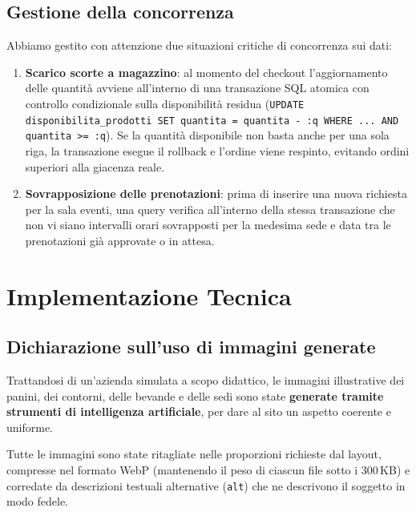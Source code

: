 \documentclass[a4paper,11pt]{article}
\begin{document}
\subsection{Gestione della concorrenza}
Abbiamo gestito con attenzione due situazioni critiche di concorrenza sui dati:
\begin{enumerate}
    \item \textbf{Scarico scorte a magazzino}: al momento del checkout l'aggiornamento delle quantità avviene all'interno di una transazione SQL atomica con controllo condizionale sulla disponibilità residua (\texttt{UPDATE disponibilita\_prodotti SET quantita = quantita - :q WHERE ... AND quantita >= :q}). Se la quantità disponibile non basta anche per una sola riga, la transazione esegue il rollback e l'ordine viene respinto, evitando ordini superiori alla giacenza reale.
    \item \textbf{Sovrapposizione delle prenotazioni}: prima di inserire una nuova richiesta per la sala eventi, una query verifica all'interno della stessa transazione che non vi siano intervalli orari sovrapposti per la medesima sede e data tra le prenotazioni già approvate o in attesa.
\end{enumerate}

\section{Implementazione Tecnica}

\subsection{Dichiarazione sull'uso di immagini generate}
Trattandosi di un'azienda simulata a scopo didattico, le immagini illustrative dei panini, dei contorni, delle bevande e delle sedi sono state \textbf{generate tramite strumenti di intelligenza artificiale}, per dare al sito un aspetto coerente e uniforme.

Tutte le immagini sono state ritagliate nelle proporzioni richieste dal layout, compresse nel formato WebP (mantenendo il peso di ciascun file sotto i 300\,KB) e corredate da descrizioni testuali alternative (\texttt{alt}) che ne descrivono il soggetto in modo fedele.
\end{document}
